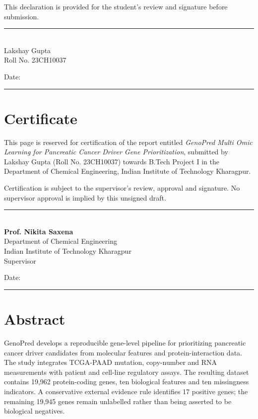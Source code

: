 \documentclass[12pt,a4paper,oneside]{report}
\begin{document}
This declaration is provided for the student's review and signature before submission.
\vspace{26mm}
\begin{flushright}
\rule{54mm}{0.4pt}\\
Lakshay Gupta\\
Roll No. 23CH10037
\end{flushright}
\vspace{8mm}
\noindent Date: \rule{35mm}{0.4pt}

\chapter*{Certificate}
This page is reserved for certification of the report entitled \emph{GenoPred Multi Omic Learning for Pancreatic Cancer Driver Gene Prioritization}, submitted by Lakshay Gupta (Roll No. 23CH10037) towards B.Tech Project I in the Department of Chemical Engineering, Indian Institute of Technology Kharagpur.

Certification is subject to the supervisor's review, approval and signature. No supervisor approval is implied by this unsigned draft.

\vspace{32mm}
\noindent\rule{65mm}{0.4pt}\\
\textbf{Prof. Nikita Saxena}\\
Department of Chemical Engineering\\
Indian Institute of Technology Kharagpur\\
Supervisor
\vspace{12mm}

\noindent Date: \rule{35mm}{0.4pt}

\chapter*{Abstract}
GenoPred develops a reproducible gene-level pipeline for prioritizing pancreatic cancer driver candidates from molecular features and protein-interaction data. The study integrates TCGA-PAAD mutation, copy-number and RNA measurements with patient and cell-line regulatory assays. The resulting dataset contains 19,962 protein-coding genes, ten biological features and ten missingness indicators. A conservative external evidence rule identifies 17 positive genes; the remaining 19,945 genes remain unlabelled rather than being asserted to be biological negatives.
\end{document}
